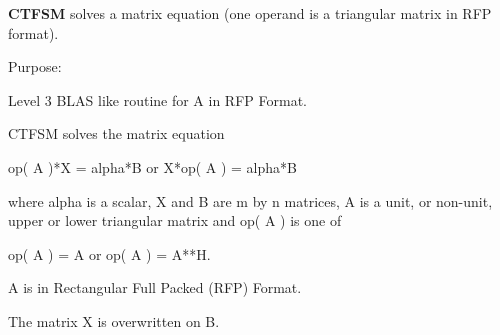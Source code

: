 {\bfseries C\+T\+F\+S\+M} solves a matrix equation (one operand is a triangular matrix in R\+F\+P format). 

 \begin{DoxyParagraph}{Purpose\+: }
\begin{DoxyVerb} Level 3 BLAS like routine for A in RFP Format.

 CTFSM solves the matrix equation

    op( A )*X = alpha*B  or  X*op( A ) = alpha*B

 where alpha is a scalar, X and B are m by n matrices, A is a unit, or
 non-unit,  upper or lower triangular matrix  and  op( A )  is one  of

    op( A ) = A   or   op( A ) = A**H.

 A is in Rectangular Full Packed (RFP) Format.

 The matrix X is overwritten on B.\end{DoxyVerb}
 
\end{DoxyParagraph}

